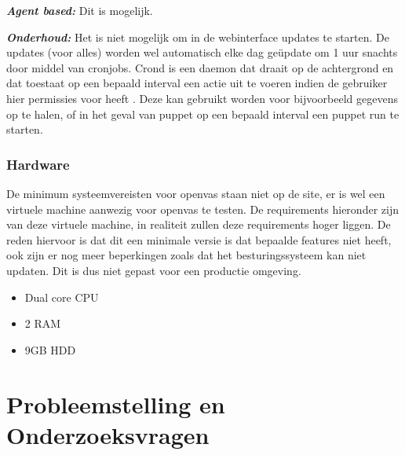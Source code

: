 \textbf{\textit{Agent based: }} Dit is mogelijk.

\textbf{\textit{Onderhoud: }} Het is niet mogelijk om in de webinterface updates te starten. De updates (voor alles) worden wel automatisch elke dag geüpdate om 1 uur snachts door middel van cronjobs. Crond is een daemon dat draait op de achtergrond en dat toestaat op een bepaald interval een actie uit te voeren indien de gebruiker hier permissies voor heeft \textcite{adminschoice}. Deze kan gebruikt worden voor bijvoorbeeld gegevens op te halen, of in het geval van puppet op een bepaald interval een puppet run te starten.

\subsubsection{Hardware}
De minimum systeemvereisten voor openvas staan niet op de site, er is wel een virtuele machine aanwezig voor openvas te testen. De requirements hieronder zijn van deze virtuele machine, in realiteit zullen deze requirements hoger liggen. De reden hiervoor is dat dit een minimale versie is dat bepaalde features niet heeft, ook zijn er nog meer beperkingen zoals dat het besturingssysteem kan niet updaten. Dit is dus niet gepast voor een productie omgeving.

\begin{itemize}
\item Dual core CPU
\item 2 RAM
\item 9GB HDD
\end{itemize}

\textcite{Openvas-requirements}


\section{Probleemstelling en Onderzoeksvragen}
\label{sec:onderzoeksvragen}



